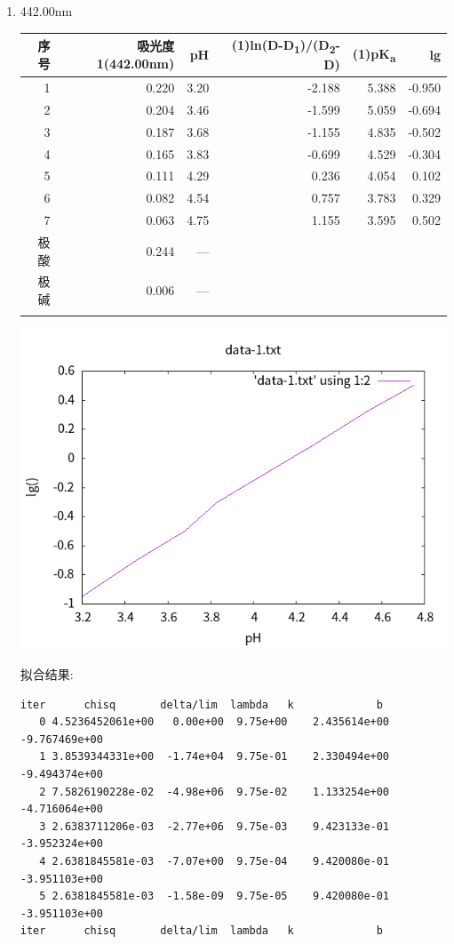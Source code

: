 \documentclass[11pt]{report}
\begin{document}
\begin{enumerate}
\item 442.00nm
\label{sec:org1d30bc0}
\begin{center}
\begin{tabular}{rrrrrr}
序号 & 吸光度1(442.00nm) & pH & (1)ln(D-D\textsubscript{1})/(D\textsubscript{2}-D) & (1)pK\textsubscript{a} & lg\\
\hline
1 & 0.220 & 3.20 & -2.188 & 5.388 & -0.950\\
2 & 0.204 & 3.46 & -1.599 & 5.059 & -0.694\\
3 & 0.187 & 3.68 & -1.155 & 4.835 & -0.502\\
4 & 0.165 & 3.83 & -0.699 & 4.529 & -0.304\\
5 & 0.111 & 4.29 & 0.236 & 4.054 & 0.102\\
6 & 0.082 & 4.54 & 0.757 & 3.783 & 0.329\\
7 & 0.063 & 4.75 & 1.155 & 3.595 & 0.502\\
极酸 & 0.244 & --- &  &  & \\
极碱 & 0.006 & --- &  &  & \\
 &  &  &  &  & \\
\end{tabular}
\end{center}

\begin{center}
\includegraphics[width=.9\linewidth]{../img/data-1.txt.png}
\end{center}
     拟合结果:
\begin{verbatim}
iter      chisq       delta/lim  lambda   k             b            
   0 4.5236452061e+00   0.00e+00  9.75e+00    2.435614e+00  -9.767469e+00
   1 3.8539344331e+00  -1.74e+04  9.75e-01    2.330494e+00  -9.494374e+00
   2 7.5826190228e-02  -4.98e+06  9.75e-02    1.133254e+00  -4.716064e+00
   3 2.6383711206e-03  -2.77e+06  9.75e-03    9.423133e-01  -3.952324e+00
   4 2.6381845581e-03  -7.07e+00  9.75e-04    9.420080e-01  -3.951103e+00
   5 2.6381845581e-03  -1.58e-09  9.75e-05    9.420080e-01  -3.951103e+00
iter      chisq       delta/lim  lambda   k             b            


\end{verbatim}
\end{enumerate}
\end{document}
